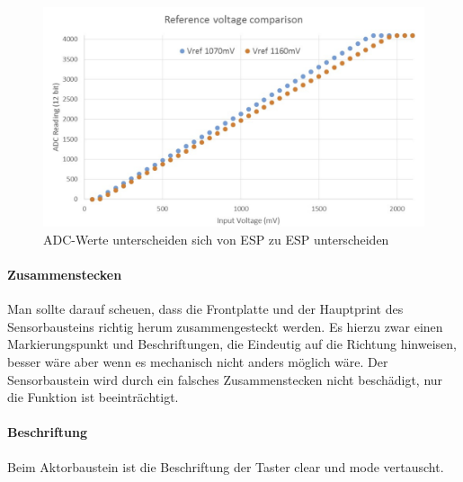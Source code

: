 \begin{figure}[h!]
	\centering
	\includegraphics[width=\textwidth]{graphics/ADC_verschieden.png}
	\caption{ADC-Werte unterscheiden sich von ESP zu ESP unterscheiden \cite{noauthor_analog_nodate}}
	\label{pic: different_ADC}
\end{figure}
	
\paragraph{Zusammenstecken}
Man sollte darauf scheuen, dass die Frontplatte und der Hauptprint des Sensorbausteins richtig herum zusammengesteckt werden. Es hierzu zwar einen Markierungspunkt und Beschriftungen, die Eindeutig auf die Richtung hinweisen, besser wäre aber wenn es mechanisch nicht anders möglich wäre. Der Sensorbaustein wird durch ein falsches Zusammenstecken nicht beschädigt, nur die Funktion ist beeinträchtigt.
	
\paragraph{Beschriftung}
Beim Aktorbaustein ist die Beschriftung der Taster clear und mode vertauscht.

